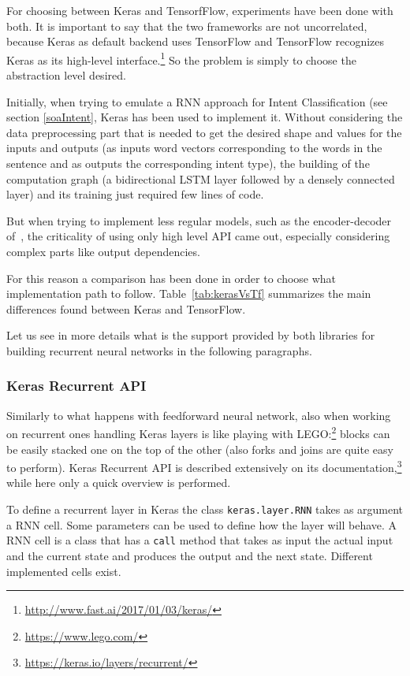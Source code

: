 For choosing between Keras and TensorfFlow, experiments have been done with both. It is important to say that the two frameworks are not uncorrelated, because Keras as default backend uses TensorFlow and TensorFlow recognizes Keras as its high-level interface.\footnote{\url{http://www.fast.ai/2017/01/03/keras/}} So the problem is simply to choose the abstraction level desired.

Initially, when trying to emulate a RNN approach for Intent Classification (see section \ref{soaIntent}, Keras has been used to implement it. Without considering the data preprocessing part that is needed to get the desired shape and values for the inputs and outputs (as inputs word vectors corresponding to the words in the sentence and as outputs the corresponding intent type), the building of the computation graph (a bidirectional LSTM layer followed by a densely connected layer) and its training just required few lines of code.

But when trying to implement less regular models, such as the encoder-decoder of~\cite{liu2016attention}, the criticality of using only high level API came out, especially considering complex parts like output dependencies.

For this reason a comparison has been done in order to choose what implementation path to follow. Table~\ref{tab:kerasVsTf} summarizes the main differences found between Keras and TensorFlow.



Let us see in more details what is the support provided by both libraries for building recurrent neural networks in the following paragraphs.

\subsubsection{Keras Recurrent API}
Similarly to what happens with feedforward neural network, also when working on recurrent ones handling Keras layers is like playing with LEGO:\footnote{\url{https://www.lego.com/}} blocks can be easily stacked one on the top of the other (also forks and joins are quite easy to perform). Keras Recurrent API is described extensively on its documentation,\footnote{\url{https://keras.io/layers/recurrent/}} while here only a quick overview is performed.

To define a recurrent layer in Keras the class \texttt{keras.layer.RNN} takes as argument a RNN cell. Some parameters can be used to define how the layer will behave. A RNN cell is a class that has a \texttt{call} method that takes as input the actual input and the current state and produces the output and the next state. Different implemented cells exist.

